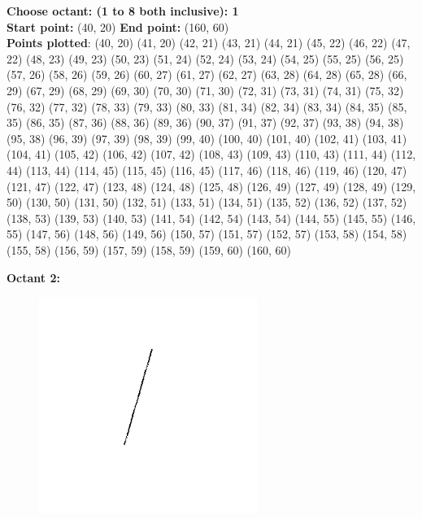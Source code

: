 \documentclass[12pt,letterpaper]{article}
\begin{document}
\textbf{Choose octant: (1 to 8 both inclusive): 1}\\
\textbf{Start point:} (40, 20)
\textbf{End point:} (160, 60)\\
\textbf{Points plotted}: 
(40, 20) (41, 20) (42, 21) (43, 21) 
(44, 21) (45, 22) (46, 22) (47, 22) 
(48, 23) (49, 23) (50, 23) (51, 24) 
(52, 24) (53, 24) (54, 25) (55, 25) 
(56, 25) (57, 26) (58, 26) (59, 26) 
(60, 27) (61, 27) (62, 27) (63, 28) 
(64, 28) (65, 28) (66, 29) (67, 29) 
(68, 29) (69, 30) (70, 30) (71, 30) 
(72, 31) (73, 31) (74, 31) (75, 32) 
(76, 32) (77, 32) (78, 33) (79, 33) 
(80, 33) (81, 34) (82, 34) (83, 34) 
(84, 35) (85, 35) (86, 35) (87, 36) 
(88, 36) (89, 36) (90, 37) (91, 37) 
(92, 37) (93, 38) (94, 38) (95, 38) 
(96, 39) (97, 39) (98, 39) (99, 40) 
(100, 40) (101, 40) (102, 41) (103, 41) 
(104, 41) (105, 42) (106, 42) (107, 42) 
(108, 43) (109, 43) (110, 43) (111, 44) 
(112, 44) (113, 44) (114, 45) (115, 45) 
(116, 45) (117, 46) (118, 46) (119, 46) 
(120, 47) (121, 47) (122, 47) (123, 48) 
(124, 48) (125, 48) (126, 49) (127, 49) 
(128, 49) (129, 50) (130, 50) (131, 50) 
(132, 51) (133, 51) (134, 51) (135, 52) 
(136, 52) (137, 52) (138, 53) (139, 53) 
(140, 53) (141, 54) (142, 54) (143, 54) 
(144, 55) (145, 55) (146, 55) (147, 56) 
(148, 56) (149, 56) (150, 57) (151, 57) 
(152, 57) (153, 58) (154, 58) (155, 58) 
(156, 59) (157, 59) (158, 59) (159, 60) 
(160, 60) 

\newpage
\textbf{Octant 2:}
\begin{figure}[h]
    \centering
    \includegraphics[height=7cm]{Outputs/O2-1.png}
\end{figure}
\end{document}
